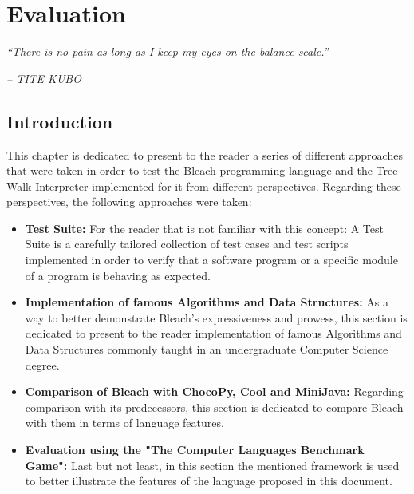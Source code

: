 \chapter{Evaluation} \label{cap:Resultados}

\begin{displayquote}
    \begin{center}
        \textit{``There is no pain as long as I keep my eyes on the balance scale.''}
    \end{center}
\end{displayquote}

\begin{flushright}
   \textit{-- TITE KUBO}
\end{flushright}

\section{Introduction}
This chapter is dedicated to present to the reader a series of different approaches that were taken in order to test the Bleach programming language and the Tree-Walk Interpreter implemented for it from different perspectives. Regarding these perspectives, the following approaches were taken:
\begin{itemize}
    \item \textbf{Test Suite:} For the reader that is not familiar with this concept: A Test Suite is a carefully tailored collection of test cases and test scripts implemented in order to verify that a software program or a specific module of a program is behaving as expected.
    
    \item \textbf{Implementation of famous Algorithms and Data Structures:} As a way to better demonstrate Bleach's expressiveness and prowess, this section is dedicated to present to the reader implementation of famous Algorithms and Data Structures commonly taught in an undergraduate Computer Science degree.
    
    \item \textbf{Comparison of Bleach with ChocoPy, Cool and MiniJava:} Regarding comparison with its predecessors, this section is dedicated to compare Bleach with them in terms of language features.
    
    \item \textbf{Evaluation using the "The Computer Languages Benchmark Game":} Last but not least, in this section the mentioned framework is used to better illustrate the features of the language proposed in this document.
\end{itemize}


